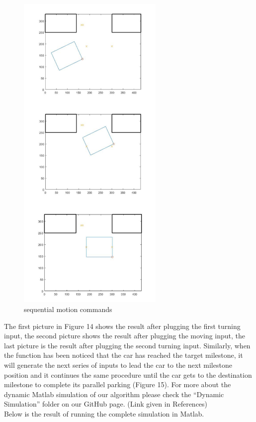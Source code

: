 \documentclass[12pt, letterpaper]{amsart} %
\numberwithin{equation}{section}
\begin{document}
\begin{figure}[h!]
\includegraphics[width=70mm]{./img/fig_14.png}
\caption{sequential motion commands}
\label{fig:figure14}	
\end{figure}

The first picture in Figure 14 shows the result after 
plugging the first turning input, the second picture 
shows the result after plugging the moving input, the 
last picture is the result after plugging the second 
turning input.
Similarly, when the function has been noticed that the 
car has reached the target milestone, it will generate 
the next series of inputs to lead the car to the next 
milestone position and it continues the same procedure   until the car gets to the destination milestone to complete its parallel parking (Figure 15).
\newpage
For more about the dynamic Matlab simulation of our algorithm please check the “Dynamic Simulation” folder on our GitHub page.
(Link given in References) 
\\ Below is the result of running the complete simulation in Matlab.  
\end{document}
